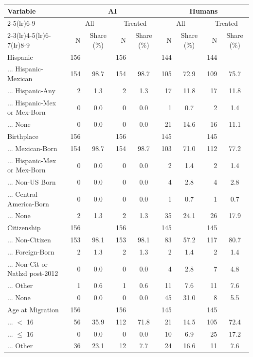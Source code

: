\begin{tabular}{lrcrcrcrc}
\toprule
Variable & \multicolumn{4}{c}{AI} & \multicolumn{4}{c}{Humans} \\
\cmidrule(lr){2-5}\cmidrule(lr){6-9}
& \multicolumn{2}{c}{All} & \multicolumn{2}{c}{Treated} & \multicolumn{2}{c}{All} & \multicolumn{2}{c}{Treated} \\
\cmidrule(lr){2-3}\cmidrule(lr){4-5}\cmidrule(lr){6-7}\cmidrule(lr){8-9}
& N & Share (\%) & N & Share (\%) & N & Share (\%) & N & Share (\%) \\
\midrule
Hispanic & 156 & & 156 & & 144 & & 144 & \\
... Hispanic-Mexican & 154 & 98.7 & 154 & 98.7 & 105 & 72.9 & 109 & 75.7 \\
... Hispanic-Any & 2 & 1.3 & 2 & 1.3 & 17 & 11.8 & 17 & 11.8 \\
... Hispanic-Mex or Mex-Born & 0 & 0.0 & 0 & 0.0 & 1 & 0.7 & 2 & 1.4 \\
... None & 0 & 0.0 & 0 & 0.0 & 21 & 14.6 & 16 & 11.1 \\
Birthplace & 156 & & 156 & & 145 & & 145 & \\
... Mexican-Born & 154 & 98.7 & 154 & 98.7 & 103 & 71.0 & 112 & 77.2 \\
... Hispanic-Mex or Mex-Born & 0 & 0.0 & 0 & 0.0 & 2 & 1.4 & 2 & 1.4 \\
... Non-US Born & 0 & 0.0 & 0 & 0.0 & 4 & 2.8 & 4 & 2.8 \\
... Central America-Born & 0 & 0.0 & 0 & 0.0 & 1 & 0.7 & 1 & 0.7 \\
... None & 2 & 1.3 & 2 & 1.3 & 35 & 24.1 & 26 & 17.9 \\
Citizenship & 156 & & 156 & & 145 & & 145 & \\
... Non-Citizen & 153 & 98.1 & 153 & 98.1 & 83 & 57.2 & 117 & 80.7 \\
... Foreign-Born & 2 & 1.3 & 2 & 1.3 & 2 & 1.4 & 2 & 1.4 \\
... Non-Cit or Natlzd post-2012 & 0 & 0.0 & 0 & 0.0 & 4 & 2.8 & 7 & 4.8 \\
... Other & 1 & 0.6 & 1 & 0.6 & 11 & 7.6 & 11 & 7.6 \\
... None & 0 & 0.0 & 0 & 0.0 & 45 & 31.0 & 8 & 5.5 \\
Age at Migration & 156 & & 156 & & 145 & & 145 & \\
... $<$ 16 & 56 & 35.9 & 112 & 71.8 & 21 & 14.5 & 105 & 72.4 \\
... $\leq$ 16 & 0 & 0.0 & 0 & 0.0 & 10 & 6.9 & 25 & 17.2 \\
... Other & 36 & 23.1 & 12 & 7.7 & 24 & 16.6 & 11 & 7.6 \\

\end{tabular}
